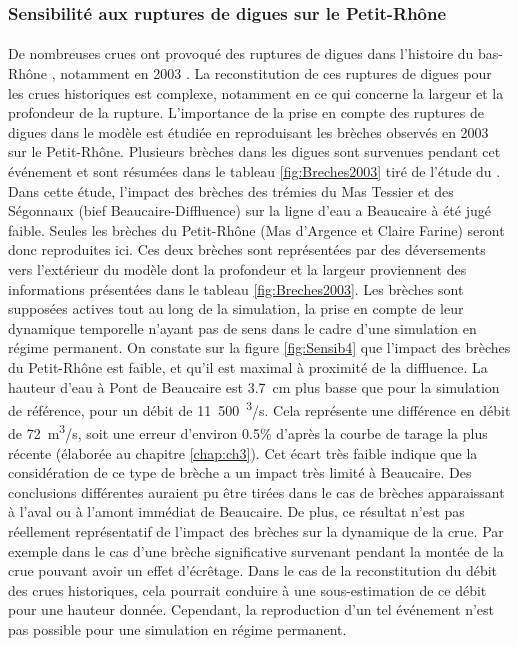 	\subsubsection{Sensibilité aux ruptures de digues sur le Petit-Rhône}
	
	\paragraph{} De nombreuses crues ont provoqué des ruptures de digues dans l'histoire du bas-Rhône \citep{pichard_sept_2014}, notamment en 2003 \citep{medd_debit_2005}. La reconstitution de ces ruptures de digues pour les crues historiques est complexe, notamment en ce qui concerne la largeur et la profondeur de la rupture. L'importance de la prise en compte des ruptures de digues dans le modèle est étudiée en reproduisant les brèches observés en 2003 sur le Petit-Rhône. Plusieurs brèches dans les digues sont survenues pendant cet événement et sont résumées dans le tableau \ref{fig:Breches2003} tiré de l'étude du \citet{symadrem_programme_2012}. Dans cette étude, l'impact des brèches des trémies du Mas Tessier et des Ségonnaux (bief Beaucaire-Diffluence) sur la ligne d'eau a Beaucaire à été jugé faible. Seules les brèches du Petit-Rhône (Mas d'Argence et Claire Farine) seront donc reproduites ici. Ces deux brèches sont représentées par des déversements vers l'extérieur du modèle dont la profondeur et la largeur proviennent des informations présentées dans le tableau \ref{fig:Breches2003}. Les brèches sont supposées actives tout au long de la simulation, la prise en compte de leur dynamique temporelle n'ayant pas de sens dans le cadre d'une simulation en régime permanent. On constate sur la figure \ref{fig:Sensib4} que l'impact des brèches du Petit-Rhône est faible, et qu'il est maximal à proximité de la diffluence. La hauteur d'eau à Pont de Beaucaire est 3.7~cm plus basse que pour la simulation de référence, pour un débit de 11~500~\textsuperscript{3}/s. Cela représente une différence en débit de 72~m\textsuperscript{3}/s, soit une erreur d'environ 0.5\% d'après la courbe de tarage la plus récente (élaborée au chapitre \ref{chap:ch3}). Cet écart très faible indique que la considération de ce type de brèche a un impact très limité à Beaucaire. Des conclusions différentes auraient pu être tirées dans le cas de brèches apparaissant à l'aval ou à l'amont immédiat de Beaucaire. De plus, ce résultat n'est pas réellement représentatif de l'impact des brèches sur la dynamique de la crue. Par exemple dans le cas d'une brèche significative survenant pendant la montée de la crue pouvant avoir un effet d'écrêtage. Dans le cas de la reconstitution du débit des crues historiques, cela pourrait conduire à une sous-estimation de ce débit pour une hauteur donnée. Cependant, la reproduction d'un tel événement n'est pas possible pour une simulation en régime permanent.
	
